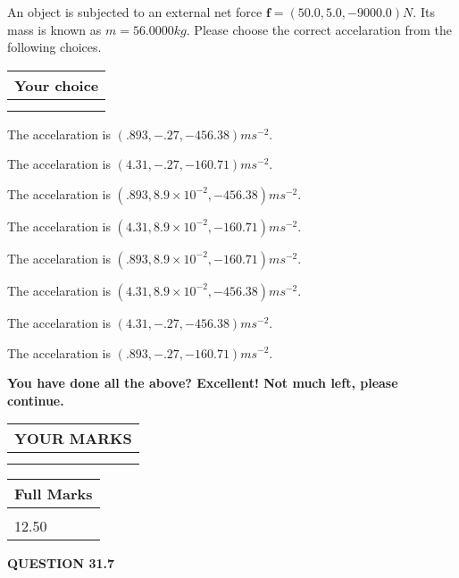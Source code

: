 \documentclass[12pt]{article}
\begin{document}
  
 
 
An object is subjected to an external net force $\mathbf{f}=
(50.0 , 5.0 , -9000.0) N$.
Its mass is known as $m= %
56.0000 kg$. Please choose the
correct accelaration from the following choices.
 
  
  
\noindent\hspace{3.0in} \begin{tabular}{|l|}
\hline
Your choice \\
\hline
 \\ 
 \\ 
\hline
\end{tabular}
  
  
 
 
The accelaration is $  %
(
.893,
-.27,
-456.38)
ms^{-2} $.
 
 
The accelaration is $  %
(
4.31,
-.27,
-160.71)
ms^{-2} $.
 
 
The accelaration is $  %
(
.893,
8.9 \times 10^{-2},
-456.38)
ms^{-2} $.
 
 
The accelaration is $  %
(
4.31,
8.9 \times 10^{-2},
-160.71)
ms^{-2} $.
 
 
The accelaration is $  %
(
.893,
8.9 \times 10^{-2},
-160.71)
ms^{-2} $.
 
 
The accelaration is $  %
(
4.31,
8.9 \times 10^{-2},
-456.38)
ms^{-2} $.
 
 
The accelaration is $  %
(
4.31,
-.27,
-456.38)
ms^{-2} $.
 
 
The accelaration is $  %
(
.893,
-.27,
-160.71)
ms^{-2} $.
 
 
 

 

 
\vspace{0.3in}
   
   
\vspace{0.3in}
{\textbf{\LARGE{You have done all the above? Excellent! Not much left, please continue.}}}
\vspace{0.3in}
   
   
  
\vspace{0.2in}
  
\noindent\begin{tabular}{|l|}
\hline
 YOUR MARKS  \\
\hline
 \\ 
 \\ 
\hline
\end{tabular}
\hspace{0.05in} \begin{tabular}{|l|}
\hline
 Full Marks  \\
\hline
 \\ 
12.50 \\
\hline
\end{tabular}
{\textbf{\Large{QUESTION
31.7 
}}}
  
\end{document}
